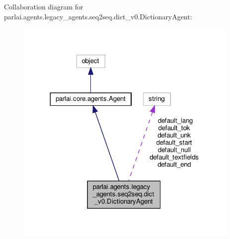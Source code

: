 Collaboration diagram for parlai.\+agents.\+legacy\+\_\+agents.\+seq2seq.\+dict\+\_\+v0.\+Dictionary\+Agent\+:
\nopagebreak
\begin{figure}[H]
\begin{center}
\leavevmode
\includegraphics[width=305pt]{d5/d36/classparlai_1_1agents_1_1legacy__agents_1_1seq2seq_1_1dict__v0_1_1DictionaryAgent__coll__graph}
\end{center}
\end{figure}
